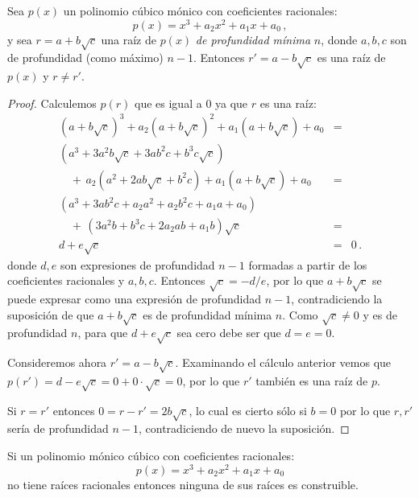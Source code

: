 \begin{theorem}\label{thm.trisect.conjugate}
Sea $p(x)$ un polinomio cúbico mónico con coeficientes racionales:
\[
p(x)=x^3+a_2x^2+a_1x+a_0\,,
\]
y sea $r=a+b\sqrt{c}$ una raíz de $p(x)$ \emph{de profundidad mínima} $n$, donde $a,b,c$ son de profundidad (como máximo) $n-1$. Entonces $r'=a-b\sqrt{c}$ es una raíz de $p(x)$ y $r\neq r'$.
\end{theorem}

\begin{proof}
Calculemos $p(r)$ que es igual a $0$ ya que $r$ es una raíz:
\[
\renewcommand{\arraystretch}{1.4}
\begin{array}{lcr}
(a+b\sqrt{c})^3+a_2(a+b\sqrt{c})^2+a_1(a+b\sqrt{c})+a_0&=\\
(a^3+3a^2b\sqrt{c}+3ab^2c+b^3c\sqrt{c})\\
\quad+\,a_2(a^2+2ab\sqrt{c}+b^2c) +a_1(a+b\sqrt{c}) +a_0&=\\
(a^3+3ab^2c+a_2a^2+a_2b^2c+a_1a+a_0)\\
\quad+\,(3a^2b+b^3c+2a_2ab+a_1b)\sqrt{c}&=\\
d+e\sqrt{c}&=&0\,.
\end{array}
\]
donde $d,e$ son expresiones de profundidad $n-1$ formadas a partir de los coeficientes racionales y $a,b,c$. Entonces $\sqrt{c}=-d/e$, por lo que $a+b\sqrt{c}$ se puede expresar como una expresión de profundidad $n-1$, contradiciendo la suposición de que $a+b\sqrt{c}$ es de profundidad mínima $n$. Como $\sqrt{c}\neq 0$ y es de profundidad $n$, para que $d+e\sqrt{c}$ sea cero debe ser que $d=e=0$.

Consideremos ahora $r'=a-b\sqrt{c}$. Examinando el cálculo anterior vemos que $p(r')=d-e\sqrt{c}=0+0\cdot\sqrt{c}=0$, por lo que $r'$ también es una raíz de $p$.

Si $r= r'$ entonces $0=r-r'=2b\sqrt{c}$, lo cual es cierto sólo si $b=0$ por lo que $r,r'$ sería de profundidad $n-1$, contradiciendo de nuevo la suposición.
\end{proof}                                

\begin{theorem}
Si un polinomio mónico cúbico con coeficientes racionales:
\[p(x)=x^3+a_2x^2+a_1x+a_0\] no tiene raíces racionales entonces ninguna de sus raíces es construible.
\end{theorem}

